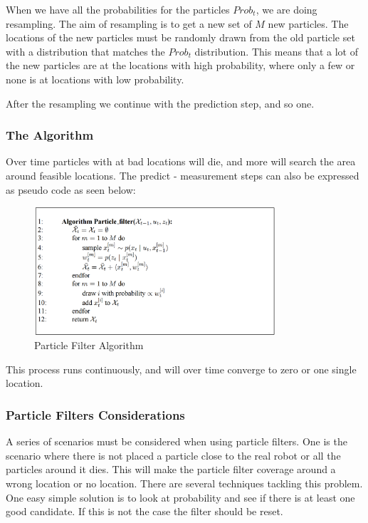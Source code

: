 When we have all the probabilities for the particles $Prob_t$, we are doing resampling. The aim of resampling is to get a new set of $M$ new particles. The locations of the new particles must be randomly drawn from the old particle set with a distribution that matches the $Prob_t$ distribution. This means that a lot of the new particles are at the locations with high probability, where only a few or none is at locations with low probability.

After the resampling we continue with the prediction step, and so one. 

\subsubsection{The Algorithm}
Over time particles with at bad locations will die, and more will search the area around feasible locations. The predict - measurement steps can also be expressed as pseudo code as seen below: 
\begin{figure}[H]
\centering
\includegraphics[width=0.8\textwidth]{billeder/ParticleFilter.png}
\caption{Particle Filter Algorithm}
\label{fig:ParticleFilter}
\end{figure}
This process runs continuously, and will over time converge to zero or one single location.

\subsubsection{Particle Filters Considerations}
A series of scenarios must be considered when using particle filters. One is the scenario where there is not placed a particle close to the real robot or all the particles around it dies. This will make the particle filter coverage around a wrong location or no location. There are several techniques tackling this problem. One easy simple solution is to look at probability and see if there is at least one good candidate. If this is not the case the filter should be reset. 

